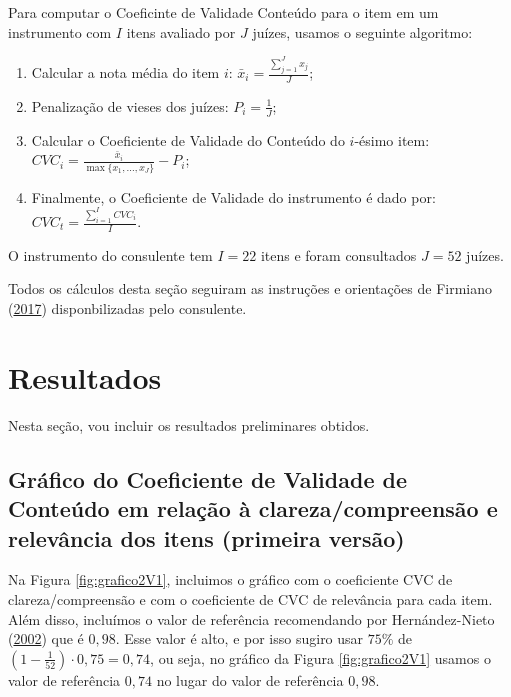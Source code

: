 \documentclass[
]{article}
\providecommand{\tightlist}{%
  \setlength{\itemsep}{0pt}\setlength{\parskip}{0pt}}
\begin{document}
Para computar o Coeficinte de Validade Conteúdo para o item em um instrumento com \(I\) itens avaliado por \(J\) juízes, usamos o seguinte algoritmo:

\begin{enumerate}
\def\labelenumi{\arabic{enumi}.}
\tightlist
\item
  Calcular a nota média do item \(i\): \(\bar{x}_i = \frac{\sum_{j=1}^{J}x_j}{J}\);
\item
  Penalização de vieses dos juízes: \(P_i = \frac{1}{J}\);
\item
  Calcular o Coeficiente de Validade do Conteúdo do \(i\)-ésimo item: \(CVC_i = \frac{\bar{x}_i}{\max{\{x_1, \dots, x_J\}}} - P_i\);
\item
  Finalmente, o Coeficiente de Validade do instrumento é dado por: \(CVC_t = \frac{\sum_{i=1}^{I}CVC_i}{I}\).
\end{enumerate}

O instrumento do consulente tem \(I = 22\) itens e foram consultados \(J = 52\) juízes.

Todos os cálculos desta seção seguiram as instruções e orientações de Firmiano (\protect\hyperlink{ref-firmiano2017escala}{2017}) disponbilizadas pelo consulente.

\newpage

\hypertarget{resultados}{%
\section{Resultados}\label{resultados}}

Nesta seção, vou incluir os resultados preliminares obtidos.

\hypertarget{gruxe1fico-do-coeficiente-de-validade-de-conteuxfado-em-relauxe7uxe3o-uxe0-clarezacompreensuxe3o-e-relevuxe2ncia-dos-itens-primeira-versuxe3o}{%
\subsection{Gráfico do Coeficiente de Validade de Conteúdo em relação à clareza/compreensão e relevância dos itens (primeira versão)}\label{gruxe1fico-do-coeficiente-de-validade-de-conteuxfado-em-relauxe7uxe3o-uxe0-clarezacompreensuxe3o-e-relevuxe2ncia-dos-itens-primeira-versuxe3o}}

Na Figura \ref{fig:grafico2V1}, incluimos o gráfico com o coeficiente CVC de clareza/compreensão e com o coeficiente de CVC de relevância para cada item. Além disso, incluímos o valor de referência recomendando por Hernández-Nieto (\protect\hyperlink{ref-hernandez2002contributions}{2002}) que é \(0,98\). Esse valor é alto, e por isso sugiro usar \(75\%\) de \(\left(1 - \frac{1}{52}\right) \cdot 0,75 = 0,74\), ou seja, no gráfico da Figura \ref{fig:grafico2V1} usamos o valor de referência \(0,74\) no lugar do valor de referência \(0,98\).
\end{document}
